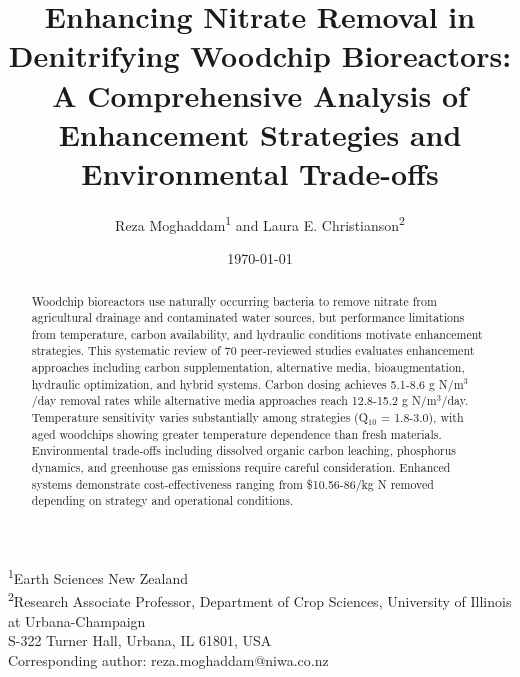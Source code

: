 \documentclass[12pt,a4paper]{article}
\title{Enhancing Nitrate Removal in Denitrifying Woodchip Bioreactors: A Comprehensive Analysis of Enhancement Strategies and Environmental Trade-offs\added[id=auth]{ - Revised Manuscript}}
\author{Reza Moghaddam\textsuperscript{1} and Laura E. Christianson\textsuperscript{2}}
\date{\today}
\begin{document}
\maketitle

\begin{center}
\footnotesize
\textsuperscript{1}Earth Sciences New Zealand\\
\textsuperscript{2}Research Associate Professor, Department of Crop Sciences, University of Illinois at Urbana-Champaign\\
S-322 Turner Hall, Urbana, IL 61801, USA\\
Corresponding author: reza.moghaddam@niwa.co.nz
\end{center}

\begin{abstract}
Woodchip bioreactors use naturally occurring bacteria to remove nitrate from agricultural drainage and contaminated water sources, but performance limitations from temperature, carbon availability, and hydraulic conditions motivate enhancement strategies. This systematic review of 70 peer-reviewed studies evaluates enhancement approaches including carbon supplementation, alternative media, bioaugmentation, hydraulic optimization, and hybrid systems.  Carbon dosing achieves 5.1-8.6 g N/m$^3$/day removal rates while alternative media approaches reach 12.8-15.2 g N/m$^3$/day. Temperature sensitivity varies substantially among strategies (Q$_{10}$ = 1.8-3.0), with aged woodchips showing greater temperature dependence than fresh materials. Environmental trade-offs including dissolved organic carbon leaching, phosphorus dynamics, and greenhouse gas emissions require careful consideration.  Enhanced systems demonstrate cost-effectiveness ranging from \$10.56-86/kg N removed depending on strategy and operational conditions. 
\end{abstract}
\end{document}
